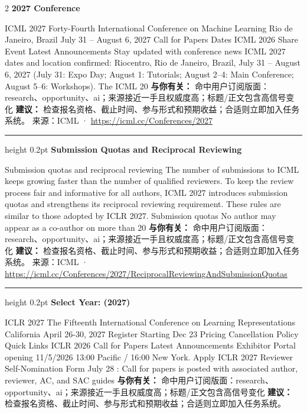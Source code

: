 \documentclass[10.5pt]{ctexart}
\begin{document}
\begin{multicols}{2}
{\large\bfseries 2027 Conference}\par
ICML 2027 Forty-Fourth International Conference on Machine Learning Rio de Janeiro, Brazil July 31 – August 6, 2027 Call for Papers Dates ICML 2026 Share Event Latest Announcements Stay updated with conference news ICML 2027 dates and location confirmed: Riocentro, Rio de Janeiro, Brazil, July 31 – August 6, 2027 (July 31: Expo Day; August 1: Tutorials; August 2–4: Main Conference; August 5–6: Workshops). The ICML 20
\textbf{与你有关：} 命中用户订阅版面：research、opportunity、ai；来源接近一手且权威度高；标题/正文包含高信号变化
\textbf{建议：} 检查报名资格、截止时间、参与形式和预期收益；合适则立即加入任务系统。
{\footnotesize\color{ormuted} 来源：ICML · \url{https://icml.cc/Conferences/2027}}
\vspace{2mm}
\hrule height 0.2pt
\vspace{2mm}
{\large\bfseries Submission Quotas and Reciprocal Reviewing}\par
Submission quotas and reciprocal reviewing The number of submissions to ICML keeps growing faster than the number of qualified reviewers. To keep the review process fair and informative for all authors, ICML 2027 introduces submission quotas and strengthens its reciprocal reviewing requirement. These rules are similar to those adopted by ICLR 2027. Submission quotas No author may appear as a co-author on more than 20
\textbf{与你有关：} 命中用户订阅版面：research、opportunity、ai；来源接近一手且权威度高；标题/正文包含高信号变化
\textbf{建议：} 检查报名资格、截止时间、参与形式和预期收益；合适则立即加入任务系统。
{\footnotesize\color{ormuted} 来源：ICML · \url{https://icml.cc/Conferences/2027/ReciprocalReviewingAndSubmissionQuotas}}
\vspace{2mm}
\hrule height 0.2pt
\vspace{2mm}
{\large\bfseries Select Year: (2027)}\par
ICLR 2027 The Fifteenth International Conference on Learning Representations California April 26-30, 2027 Register Starting Dec 23 Pricing Cancellation Policy Quick Links ICLR 2026 Call for Papers Latest Announcements Exhibitor Portal opening 11/5/2026 13:00 Pacific / 16:00 New York. Apply ICLR 2027 Reviewer Self-Nomination Form July 28 : Call for papers is posted with associated author, reviewer, AC, and SAC guides 
\textbf{与你有关：} 命中用户订阅版面：research、opportunity、ai；来源接近一手且权威度高；标题/正文包含高信号变化
\textbf{建议：} 检查报名资格、截止时间、参与形式和预期收益；合适则立即加入任务系统。

\end{multicols}
\end{document}
